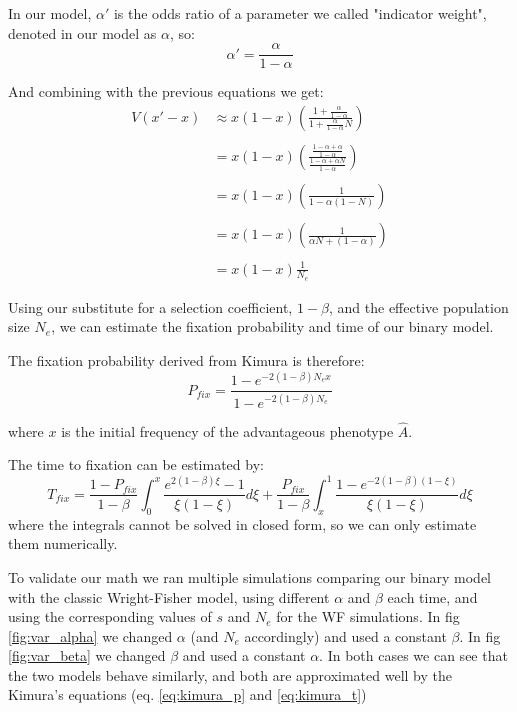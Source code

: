 \documentclass[11pt]{article}
\begin{document}
In our model, $\alpha'$ is the odds ratio of a parameter we called "indicator weight", denoted in our model as $\alpha$, so:
\begin{equation}
\alpha' = \frac{\alpha}{1-\alpha}
\end{equation}

And combining with the previous equations we get:
\begin{equation}\label{eq:const_var}
\begin{split}
V(x'-x) & \approx x(1-x)(\frac{1 + \frac{\alpha}{1-\alpha}}{1 + \frac{\alpha}{1-\alpha} N})\\\\
 &= x(1-x)(\frac{\frac{1-\alpha+\alpha}{1-\alpha}}{\frac{1-\alpha+\alpha N}{1-\alpha}})\\\\
 &= x(1-x)(\frac{1}{1- \alpha(1-N)})\\\\
  &= x(1-x)(\frac{1}{\alpha N + (1-\alpha)})\\\\
  &= x(1-x)\frac{1}{N_e}
\end{split}
\end{equation}

Using our substitute for a selection coefficient, $1-\beta$, and the effective population size $N_e$, we can estimate the fixation probability and time of our binary model.

The fixation probability derived from Kimura is therefore:
\begin{equation}\label{eq:kimura_p}
P_{fix} = \frac{1-e^{-2(1-\beta)N_e x}}{1-e^{-2(1-\beta)N_e}}
\end{equation}

where $x$ is the initial frequency of the advantageous phenotype $\hat{A}$.

The time to fixation can be estimated by:
\begin{equation}\label{eq:kimura_t}
T_{fix}=\frac{1-P_{fix}}{1-\beta}\int_0^x\frac{e^{2(1-\beta) \xi}-1}{\xi(1-\xi)}d\xi+ \frac{P_{fix}}{1-\beta}\int_x^1\frac{1-e^{-2(1-\beta)(1-\xi)}}{\xi(1-\xi)}d\xi
\end{equation}
where the integrals cannot be solved in closed form, so we can only estimate them numerically.

To validate our math we ran multiple simulations comparing our binary model with the classic Wright-Fisher model, using different $\alpha$ and $\beta$ each time, and using the corresponding values of $s$ and $N_e$ for the WF simulations.
In fig \ref{fig:var_alpha} we changed $\alpha$ (and $N_e$ accordingly) and used a constant $\beta$.
In fig \ref{fig:var_beta} we changed $\beta$ and used a constant $\alpha$.
In both cases we can see that the two models behave similarly, and both are approximated well by the Kimura's equations (eq. \ref{eq:kimura_p} and \ref{eq:kimura_t})
\end{document}
